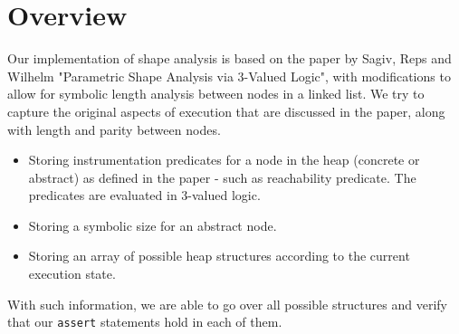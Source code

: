 \section*{Overview}
Our implementation of shape analysis is based on the paper by Sagiv, Reps and Wilhelm "Parametric Shape Analysis via 3-Valued Logic", with modifications to allow for symbolic length analysis between nodes in a linked list. We try to capture the original aspects of execution that are discussed in the paper, along with length and parity between nodes.
\begin{itemize}
	\item Storing instrumentation predicates for a node in the heap (concrete or abstract) as defined in the paper - such as reachability predicate. The predicates are evaluated in 3-valued logic.
	\item Storing a symbolic size for an abstract node.
	\item Storing an array of possible heap structures according to the current execution state.
\end{itemize}
With such information, we are able to go over all possible structures and verify that our \texttt{assert} statements hold in each of them.